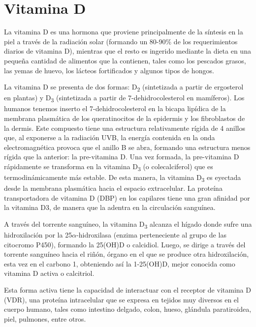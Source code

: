 \section*{Vitamina D}

La vitamina D es una hormona que proviene principalmente de la síntesis en la piel a través de la radiación solar (formando un 80-90\% de los requerimientos diarios de vitamina D), mientras que el resto es ingerido mediante la dieta en una pequeña cantidad de alimentos que la contienen, tales como los pescados grasos, las yemas de huevo, los lácteos fortificados y algunos tipos de hongos\cite{Holick_2010}.

La vitamina D se presenta de dos formas: D\textsubscript{2} (sintetizada a partir de ergosterol en plantas) y D\textsubscript{3} (sintetizada a partir de 7-dehidrocolesterol en mamíferos). Los humanos tenemos inserto el 7-dehidrocolesterol en la bicapa lipídica de la membrana plasmática de los queratinocitos de la epidermis y los fibroblastos de la dermis\cite{zuluga_2011}. Este compuesto tiene una estructura relativamente rígida de 4 anillos que, al exponerse a la radiación UVB, la energía contenida en la onda electromagnética provoca que el anillo B se abra, formando una estructura menos rígida que la anterior: la pre-vitamina D. Una vez formada, la pre-vitamina D rápidamente se transforma en la vitamina D\textsubscript{3} (o colecalciferol) que es termodinámicamente más estable. De esta manera, la vitamina D\textsubscript{3} es eyectada desde la membrana plasmática hacia el espacio extracelular. La proteína transportadora de vitamina D (DBP) en los capilares tiene una gran afinidad por la vitamina D3, de manera que la adentra en la circulación sanguínea\cite{Holick_1989}.

A través del torrente sanguíneo, la vitamina D\textsubscript{3} alcanza el hígado donde sufre una hidroxilación por la 25$\alpha$-hidroxilasa (enzima perteneciente al grupo de las citocromo P450), formando la 25(OH)D o calcidiol. Luego, se dirige a través del torrente sanguíneo hacia el riñón, órgano en el que se produce otra hidroxilación, esta vez en el carbono 1, obteniendo así la 1-25(OH)D, mejor conocida como vitamina D activa o calcitriol\cite{zuluga_2011}.

Esta forma activa tiene la capacidad de interactuar con el receptor de vitamina D (VDR), una proteína intracelular que se expresa en tejidos muy diversos en el cuerpo humano, tales como intestino delgado, colon, hueso, glándula paratiroidea,  piel, pulmones, entre otros.

